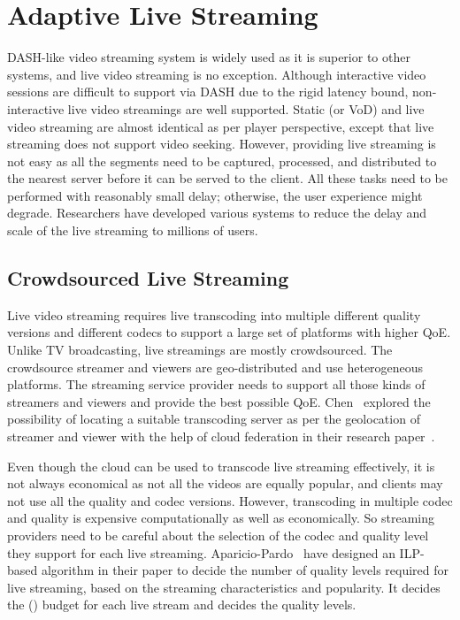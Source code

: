 \section{Adaptive Live Streaming}
\label{chapter02:live}
\ac{DASH}-like video streaming system is widely used as it is superior to other systems, and live video streaming is no exception. Although interactive video sessions are difficult to support via \ac{DASH} due to the rigid latency bound, non-interactive live video streamings are well supported. Static (or \ac{VoD}) and live video streaming are almost identical as per player perspective, except that live streaming does not support video seeking. However, providing live streaming is not easy as all the segments need to be captured, processed, and distributed to the nearest server before it can be served to the client. All these tasks need to be performed with reasonably small delay; otherwise, the user experience might degrade. Researchers have developed various systems to reduce the delay and scale of the live streaming to millions of users.

\subsection{Crowdsourced Live Streaming}
Live video streaming requires live transcoding into multiple different quality versions and different codecs to support a large set of platforms with higher \ac{QoE}. Unlike TV broadcasting, live streamings are mostly crowdsourced. The crowdsource streamer and viewers are geo-distributed and use heterogeneous platforms. The streaming service provider needs to support all those kinds of streamers and viewers and provide the best possible \ac{QoE}. Chen \etal\ explored the possibility of locating a suitable transcoding server as per the geolocation of streamer and viewer with the help of cloud federation in their research paper~\cite{7218642}.

Even though the cloud can be used to transcode live streaming effectively, it is not always economical as not all the videos are equally popular, and clients may not use all the quality and codec versions. However, transcoding in multiple codec and quality is expensive computationally as well as economically. So streaming providers need to be careful about the selection of the codec and quality level they support for each live streaming. Aparicio-Pardo \etal\ have designed an \ac{ILP}-based algorithm in their paper \cite{10.1145/2713168.2713177} to decide the number of quality levels required for live streaming, based on the streaming characteristics and popularity. It decides the  () budget for each live stream and decides the quality levels. 


